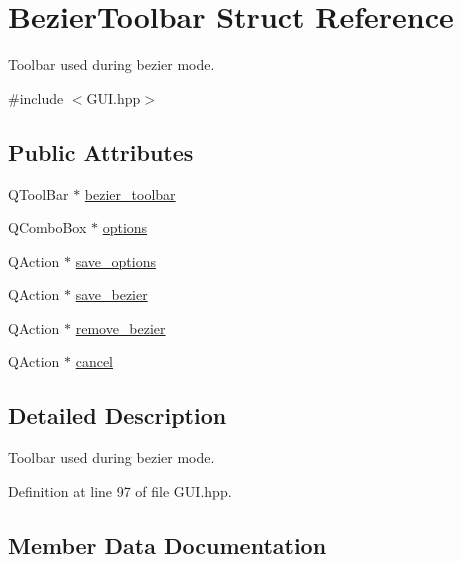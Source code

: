 \hypertarget{structBezierToolbar}{}\section{Bezier\+Toolbar Struct Reference}
\label{structBezierToolbar}


Toolbar used during bezier mode.  




{\ttfamily \#include $<$G\+U\+I.\+hpp$>$}

\subsection*{Public Attributes}
\begin{DoxyCompactItemize}
\item 
Q\+Tool\+Bar $\ast$ \mbox{\hyperlink{structBezierToolbar_a50604dd32265111bdef282bac1bd506c}{bezier\+\_\+toolbar}}
\item 
Q\+Combo\+Box $\ast$ \mbox{\hyperlink{structBezierToolbar_a84666bca25e5b6c194adaf0461c30ec3}{options}}
\item 
Q\+Action $\ast$ \mbox{\hyperlink{structBezierToolbar_a9d3e4ffe8c28b246dafd257110e28994}{save\+\_\+options}}
\item 
Q\+Action $\ast$ \mbox{\hyperlink{structBezierToolbar_a2848e3a1e3d0eb3dfe63959c12538782}{save\+\_\+bezier}}
\item 
Q\+Action $\ast$ \mbox{\hyperlink{structBezierToolbar_a1e1fd77e3baf09d382973b1ede4247cd}{remove\+\_\+bezier}}
\item 
Q\+Action $\ast$ \mbox{\hyperlink{structBezierToolbar_a5c91775ecfd6725f3707b5b838bcbbf9}{cancel}}
\end{DoxyCompactItemize}


\subsection{Detailed Description}
Toolbar used during bezier mode. 

Definition at line 97 of file G\+U\+I.\+hpp.



\subsection{Member Data Documentation}
\mbox{\label{structBezierToolbar_a50604dd32265111bdef282bac1bd506c}} 
